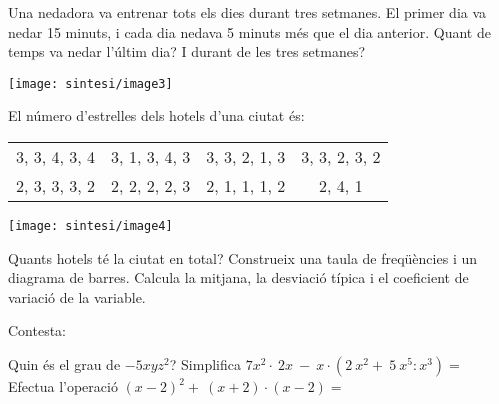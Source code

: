 \begin{mylist}
	
  \vspace{-1.25cm}
  \exer[2] \begin{minipage}[t]{0.7\textwidth}
  	Una nedadora va entrenar tots els dies durant tres setmanes. El primer dia va nedar 15 minuts, i cada dia nedava 5 minuts més que el dia anterior. Quant de temps va nedar l'últim dia? I durant de les tres setmanes?  
  \end{minipage}
  \begin{minipage}{0.3\textwidth}
  	\centering
  	\vspace{1.5cm}
  	\texttt{[image: sintesi/image3]}
  \end{minipage}
  
	\pagebreak
	\mbox{}
	  \vspace*{-1.75cm} 
	\exer[2] \begin{minipage}[t]{0.7\textwidth}
		  El número d'estrelles dels hotels d'una ciutat és:
		  \vspace{0.25cm}
		\begin{center}
		\begin{tabular}{c c c c}
		3, 3, 4, 3, 4  & 3, 1, 3, 4, 3  & 3, 3, 2, 1, 3  & 3, 3, 2, 3, 2 \\
		2, 3, 3, 3, 2  & 2, 2, 2, 2, 3 &  2, 1, 1, 1, 2 &  2, 4, 1 \\
		\end{tabular}
		\end{center}
	\end{minipage}
	\begin{minipage}{0.3\textwidth}
		\centering
		\vspace{1.5cm}
		\texttt{[image: sintesi/image4]}
	\end{minipage}
		\vspace{-0.5cm}
	\begin{tasks}
		\task Quants hotels té la ciutat en total?
		\task Construeix una taula de freqüències i un diagrama de barres.
		\task  Calcula la mitjana, la desviació típica i el coeficient de variació de la variable.
	\end{tasks}
	
	 
	
	\exer[2]  Contesta:
	\begin{tasks}
		\task  Quin és el grau de $-5xyz^2$?
		\task  Simplifica  $7x^2\cdot \ 2x\ -\ x\cdot \left(2\ x^2+\ 5\ x^5:x^3\right)=$
		\task  Efectua l'operació ${\left(x-2\right)}^2+\ \left(x+2\right)\cdot \left(x-2\right)=$
	\end{tasks}
	

\end{mylist}
